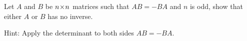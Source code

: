 
\begin{Exercise}[
name={},
title={}, 
difficulty=0,
origin={\cite{YL}}]
Let $A$ and $B$ be $n \! \times \! n$ matrices such that $AB=-BA$ and $n$ is odd, show that either $A$ or $B$ has no inverse.
\end{Exercise}

\begin{Answer}
Hint: Apply the determinant to both sides $AB=-BA$.
\end{Answer}
